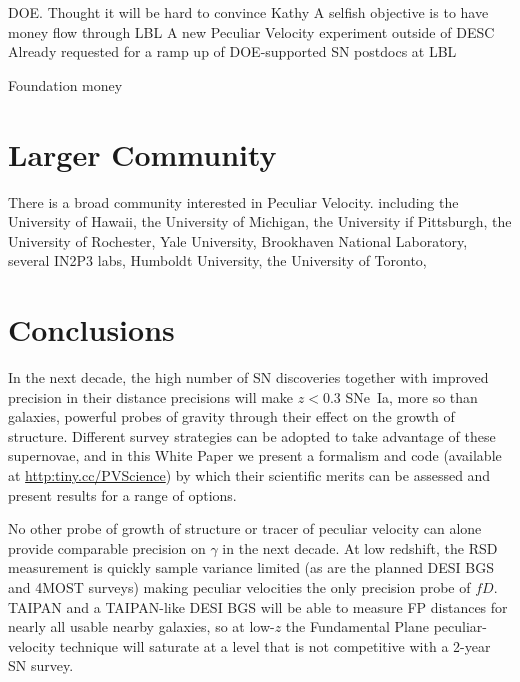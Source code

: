 \documentclass[11pt, oneside]{article}   	%
\begin{document}
DOE.  Thought it will be hard to convince Kathy
A selfish objective is to have money flow through LBL
A new Peculiar Velocity experiment outside of DESC
Already requested for a ramp up of DOE-supported SN postdocs at LBL

Foundation money


\section{Larger Community}
There is a broad community interested in Peculiar Velocity. 
including the  University of Hawaii, the University of Michigan, the University if Pittsburgh, the University of Rochester, Yale University,  Brookhaven National Laboratory,
several IN2P3 labs, Humboldt University, the University of Toronto, 

\section{Conclusions}

In the next decade,
the high number of SN discoveries together with improved precision in their distance precisions will make $z<0.3$ SNe~Ia, more so than
galaxies,  powerful probes of gravity through their effect  on the growth of structure.  Different survey strategies can be adopted to take advantage of these
supernovae, and in this White Paper we present a formalism and code (available
at \url{http:tiny.cc/PVScience})
by which their scientific merits can be assessed and present results for a range of options.

No other probe of growth of structure or tracer of peculiar velocity can alone provide comparable precision on  $\gamma$ in the next decade.
At low redshift, the RSD measurement is quickly sample variance limited (as are the planned DESI BGS and 4MOST surveys) making peculiar velocities the only 
precision probe of $fD$.
TAIPAN and a TAIPAN-like DESI BGS will be able to measure FP distances for nearly all usable nearby galaxies, so at low-$z$ the Fundamental Plane peculiar-velocity
technique will  saturate at a level that is not competitive with a  2-year SN survey.







\end{document}
